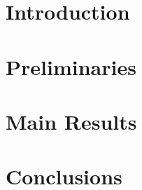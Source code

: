 \documentclass{article}
\begin{document}
\section{Introduction}

\lipsum[1-3]

\newpage
\section{Preliminaries}

\lipsum[4-6]

\newpage
\section{Main Results}

\lipsum[7-9]

\newpage
\section{Conclusions}

\lipsum[10-12]
\end{document}
